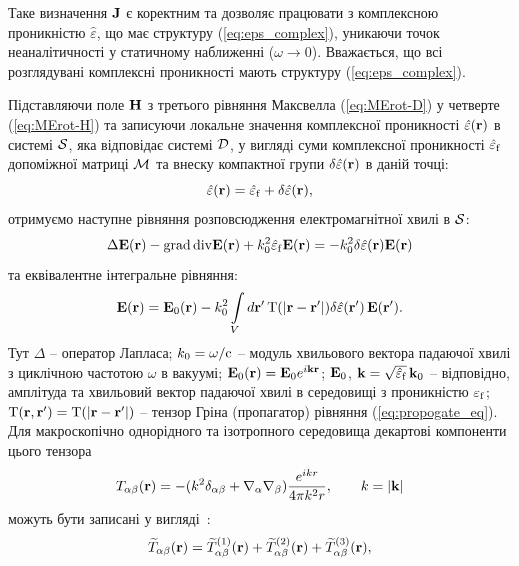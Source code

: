 \documentclass[14pt,twoside]{vakthesis}
\begin{document}
Таке визначення $\bf J$ є коректним та дозволяє працювати з комплексною проникністю $\hat{\varepsilon}$, що має структуру (\ref{eq:eps_complex}), уникаючи точок неаналітичності у статичному наближенні ($\omega \to 0$). Вважається, що всі розглядувані комплексні проникності мають структуру (\ref{eq:eps_complex}).

Підставляючи поле ${\bf H}$ з третього рівняння Максвелла (\ref{eq:MErot-D}) у четверте (\ref{eq:MErot-H}) та записуючи локальне значення комплексної проникності $\hat{\varepsilon}({\bf r})$ в системі $\cal S$, яка відповідає системі $\cal D$, у вигляді суми комплексної проникності $\hat{\varepsilon}_{\rm f}$ допоміжної матриці $\cal M$ та внеску компактної групи $\delta\hat{\varepsilon}({\bf r})$ в даній точці:
$$
\hat{\varepsilon}({\bf r}) = \hat{\varepsilon}_{\rm f} + \delta\hat{\varepsilon}({\bf r}),
$$
отримуємо наступне рівняння розповсюдження електромагнітної хвилі в $\cal S$:
\begin{equation} \label{eq:propogate_eq}
\Delta {\bf E} ({\bf r}) - {\rm grad}\, {\rm div} {\bf E} ({\bf r}) + k_0^{2}\hat{\varepsilon}_{\rm f} {\bf E} ({\bf r})  = - k_{0}^{2} \delta
\hat{\varepsilon} ({\bf r}) {\bf E} ({\bf r})
\end{equation}
та еквівалентне інтегральне рівняння:
\begin{equation}\label{eq:integral_field}
{\bf E}({\rm {\bf r}}) = {\bf E}_{0} ({\bf r}) -
k_{0}^{2} \int\limits_{V} d{\bf r}'\, {\rm T}(|{\bf r} - {\bf r}'|)
\delta \hat{\varepsilon} ({\bf r}')\, {\bf E}({\bf r}').
\end{equation}
Тут $\Delta$ -- оператор Лапласа; $k_0 = \omega/{\rm c}$ -- модуль хвильового вектора падаючої хвилі з циклічною частотою $\omega$ в вакуумі; ${\bf E}_0 ({\bf r}) = {\bf E}_0 e^{i {\bf k}{\bf r}}$;
${\bf E}_0$, ${\bf k} = \sqrt{\hat{\varepsilon}_{\rm f}}\,
{\bf k}_0$ -- відповідно, амплітуда та хвильовий вектор
падаючої хвилі в середовищі з проникністю ${\varepsilon}_{\rm f}$; 
${\rm T}({\bf r}, {\bf r}') = {\rm T}(|{\bf r} - {\bf r}'|)$ -- тензор Гріна (пропагатор) рівняння (\ref{eq:propogate_eq}). Для макроскопічно однорідного та ізотропного середовища декартові компоненти цього тензора 
\begin{equation}\label{eq:propogator-eps-origin}
	T_{\alpha\beta}({\rm {\bf r}}) = -(k^2\delta_{\alpha\beta} + \nabla_\alpha \nabla_\beta)\frac{e^{ikr}}{4\pi k^2r},\qquad k=|{\bf k}|
\end{equation}
можуть бути записані у вигляді~\cite{Ryzhov1965, Weighofer1989, Weiglhofer1995, Sushko2004}:
\begin{eqnarray}\label{eq:propagator-eps}
{\widetilde T}_{\alpha\beta} ({\rm {\bf r}})
= {\widetilde T}_{\alpha\beta}^{(1)} ({\rm {\bf r}}) + {\widetilde T}_{\alpha\beta}^{(2)} ({\rm {\bf r}}) + {\widetilde T}_{\alpha\beta}^{(3)} ({\rm {\bf r}}),
\end{eqnarray}
\end{document}
